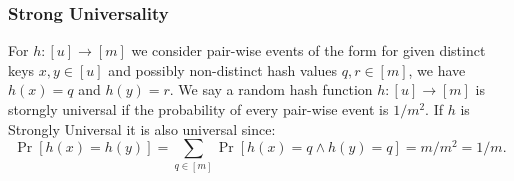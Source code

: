 \subsubsection{Strong Universality}
For $h : [u] \rightarrow [m]$ we consider pair-wise events of the form for given
distinct keys $x,y \in [u]$ and possibly non-distinct hash values $q,r \in [m]$,
we have $h(x) = q$ and $h(y) = r$. We say a random hash function $h : [u]
\rightarrow [m]$ is storngly universal if the probability of every pair-wise
event is $1/m^2$. If $h$ is Strongly Universal it is also universal since:
\[
  \Pr[h(x) = h(y)] = \sum_{q\in [m]} \Pr[h(x) = q \land h(y) = q] = m/m^2  = 1/m.
\]

